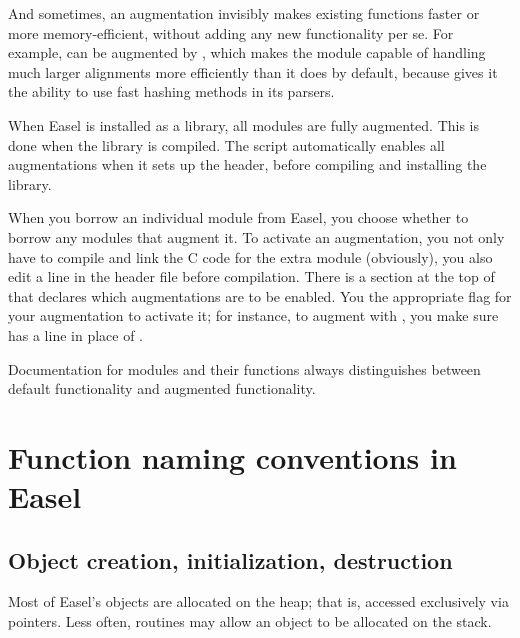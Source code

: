 And sometimes, an augmentation invisibly makes existing functions
faster or more memory-efficient, without adding any new functionality
per se.  For example,  can be augmented by
, which makes the  module capable of
handling much larger alignments more efficiently than it does by
default, because  gives it the ability to use fast
hashing methods in its parsers.

When Easel is installed as a library, all modules are fully
augmented. This is done when the library is compiled. The
 script automatically enables all augmentations when
it sets up the  header, before compiling and installing
the library.

When you borrow an individual module from Easel, you choose whether to
borrow any modules that augment it. To activate an augmentation, you
not only have to compile and link the C code for the extra module
(obviously), you also edit a line in the  header file
before compilation. There is a section at the top of 
that declares which augmentations are to be enabled. You
 the appropriate flag for your augmentation to
activate it; for instance, to augment with , you make sure
 has a line  in place
of .

Documentation for modules and their functions always distinguishes
between default functionality and augmented functionality.

\section{Function naming conventions in Easel}

\subsection{Object creation, initialization, destruction}

Most of Easel's objects are allocated on the heap; that is, accessed
exclusively via pointers. Less often, routines may allow an object to
be allocated on the stack.

